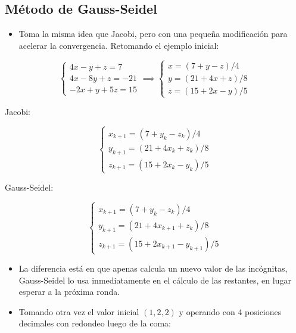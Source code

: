 \documentclass[openany]{book}
\providecommand{\tightlist}{%
  \setlength{\itemsep}{0pt}\setlength{\parskip}{0pt}}
\begin{document}
\hypertarget{muxe9todo-de-gauss-seidel}{%
\subsection{Método de Gauss-Seidel}\label{muxe9todo-de-gauss-seidel}}

\begin{itemize}
\tightlist
\item
  Toma la misma idea que Jacobi, pero con una pequeña modificación para acelerar la convergencia. Retomando el ejemplo inicial:
\end{itemize}

\[
\begin{cases} 
4x-y+z=7 \\
4x-8y+z=-21 \\
-2x+y+5z=15
\end{cases}
\implies
\begin{cases} 
x=(7+y-z)/4 \\
y=(21+4x+z)/8 \\
z=(15+2x-y)/5
\end{cases}
\]

Jacobi:

\[
\begin{cases} 
x_{k+1}=(7+y_k-z_k)/4 \\
y_{k+1}=(21+4x_k+z_k)/8 \\
z_{k+1}=(15+2x_k-y_k)/5
\end{cases}
\]

Gauss-Seidel:

\[
\begin{cases} 
x_{k+1}=(7+y_k-z_k)/4 \\
y_{k+1}=(21+4x_{k+1}+z_k)/8 \\
z_{k+1}=(15+2x_{k+1}-y_{k+1})/5
\end{cases}
\]

\begin{itemize}
\item
  La diferencia está en que apenas calcula un nuevo valor de las incógnitas, Gauss-Seidel lo usa inmediatamente en el cálculo de las restantes, en lugar esperar a la próxima ronda.
\item
  Tomando otra vez el valor inicial \((1, 2, 2)\) y operando con 4 posiciones decimales con redondeo luego de la coma:
\end{itemize}
\end{document}

